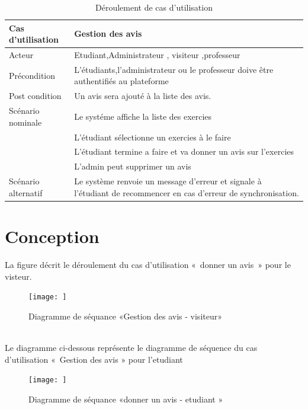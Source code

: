\begin{table}[h]
    \begin{center} 
    \begin{tabular}{|p{4cm}|p{9cm}|}  \hline 
       Cas d'utilisation& Gestion des avis \\ \hline
       Acteur& Etudiant,Administrateur , visiteur ,professeur\\ \hline
       Précondition&  L'étudiants,l'administrateur ou le professeur doive être authentifiés au plateforme &  \\ \hline
       Post condition& Un avis sera ajouté à la liste des avis.\\ \hline


       
       Scénario nominale& Le systéme affiche la liste des exercies  \\
                        & L'étudiant sélectionne un exercies à le faire \\
                        & L'étudiant termine a faire et va donner un avis sur l'exercies \\
                        & L'admin peut supprimer un avis \\ \hline
          
                       
       Scénario alternatif& Le système renvoie un message d’erreur et signale à l’étudiant de
recommencer en cas d’erreur de synchronisation. \\  \hline
  \end{tabular}
  \end{center}
  \caption{ Déroulement de cas d'utilisation}
\label{tab:bert_res}
\end{table}

\section{Conception }

La figure  décrit le déroulement du cas d’utilisation « donner un avis » pour le visteur.
\begin{figure}[h!]
    \centering
    \texttt{[image: ]}
    \caption{Diagramme de séquance «Gestion des avis - visiteur»}
    \label{fig:enter-label}
\end{figure}
\\ 

Le diagramme ci-dessous représente le diagramme de séquence du cas d’utilisation « Gestion des avis » pour l'etudiant 
\begin{figure}[h!]
    \centering
    \texttt{[image: ]}
    \caption{Diagramme de séquance «donner un avis - etudiant »}
    \label{fig:enter-label}
\end{figure}
\\


